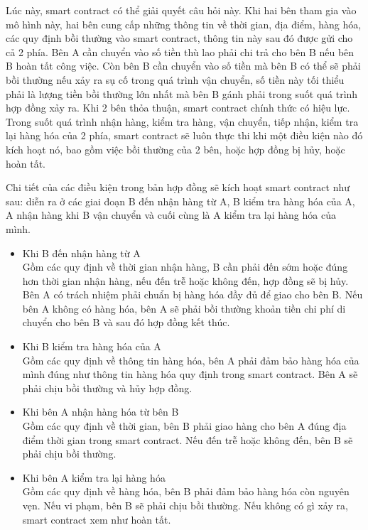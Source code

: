 Lúc này, smart contract có thể giải quyết câu hỏi này. Khi hai bên tham gia vào mô hình này, hai bên cung cấp những thông tin về thời gian, địa điểm, hàng hóa, các quy định bồi thường vào smart contract, thông tin này sau đó được gửi cho cả 2 phía. Bên A cần chuyển vào số tiền thù lao phải chi trả cho bên B nếu bên B hoàn tất công việc. Còn bên B cần chuyển vào số tiền mà bên B có thể sẽ phải bồi thường nếu xảy ra sụ cố trong quá trình vận chuyển, số tiền này tối thiểu phải là lượng tiền bồi thường lớn nhất mà bên B gánh phải trong suốt quá trình hợp đồng xảy ra. Khi 2 bên thỏa thuận, smart contract chính thức có hiệu lực. Trong suốt quá trình nhận hàng, kiểm tra hàng, vận chuyển, tiếp nhận, kiểm tra lại hàng hóa của 2 phía, smart contract sẽ luôn thực thi khi một điều kiện nào đó kích hoạt nó, bao gồm việc bồi thường của 2 bên, hoặc hợp đồng bị hủy, hoặc hoàn tất.


Chi tiết của các điều kiện trong bản hợp đồng sẽ kích hoạt smart contract như sau: diễn ra ở các giai đoạn B đến nhận hàng từ A, B kiểm tra hàng hóa của A, A nhận hàng khi B vận chuyển và cuối cùng là A kiểm tra lại hàng hóa của mình.

\begin{itemize}
	\item Khi B đến nhận hàng từ A\\
	Gồm các quy định về thời gian nhận hàng, B cần phải đến sớm hoặc đúng hơn thời gian nhận hàng, nếu đến trễ hoặc không đến, hợp đồng sẽ bị hủy. Bên A có trách nhiệm phải chuẩn bị hàng hóa đầy đủ để giao cho bên B. Nếu bên A không có hàng hóa, bên A sẽ phải bồi thường khoản tiền chi phí di chuyển cho bên B và sau đó hợp đồng kết thúc.
	
	\item Khi B kiểm tra hàng hóa của A\\
	Gồm các quy định về thông tin hàng hóa, bên A phải đảm bảo hàng hóa của mình đúng như thông tin hàng hóa quy định trong smart contract. Bên A sẽ phải chịu bồi thường và hủy hợp đồng.
	
	\item Khi bên A nhận hàng hóa từ bên B\\
	Gồm các quy định về thời gian, bên B phải giao hàng cho bên A đúng địa điểm thời gian trong smart contract. Nếu đến trễ hoặc không đến, bên B sẽ phải chịu bồi thường.
	
	\item Khi bên A kiểm tra lại hàng hóa\\
	Gồm các quy định về hàng hóa, bên B phải đảm bảo hàng hóa còn nguyên vẹn. Nếu vi phạm, bên B sẽ phải chịu bồi thường. Nếu không có gì xảy ra, smart contract xem như hoàn tất.
\end{itemize}
